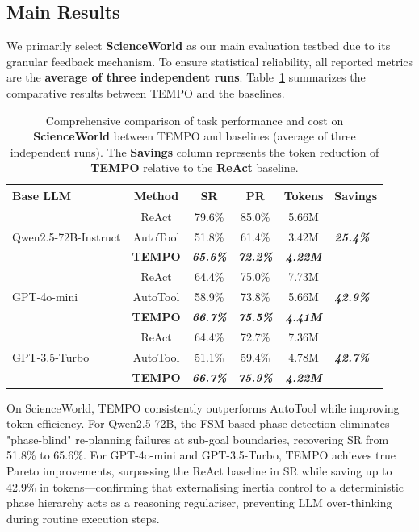 \documentclass[runningheads]{llncs}
\begin{document}
\subsection{Main Results}

We primarily select \textbf{ScienceWorld} as our main evaluation testbed due to its granular feedback mechanism. To ensure statistical reliability, all reported metrics are the \textbf{average of three independent runs}. Table~\ref{tab:main} summarizes the comparative results between TEMPO and the baselines.

\begin{table}[htb]
\centering
\small
\caption{Comprehensive comparison of task performance and cost on \textbf{ScienceWorld} between TEMPO and baselines (average of three independent runs). The \textbf{Savings} column represents the token reduction of \textbf{TEMPO} relative to the \textbf{ReAct} baseline.}
\vspace{2mm}
\begin{tabular}{lccccl}
\toprule
\textbf{Base LLM} & \textbf{Method} & \textbf{SR} & \textbf{PR} & \textbf{Tokens} & \textbf{Savings}\\
\midrule
\multirow{3}{*}{Qwen2.5-72B-Instruct} & ReAct & 79.6\% & 85.0\% & 5.66M & \multirow{3}{*}{\textsl{\textbf{25.4\%}}} \\
& AutoTool & 51.8\% & 61.4\% & 3.42M & \\
& \textbf{TEMPO} & \textsl{\textbf{65.6\%}} & \textsl{\textbf{72.2\%}} & \textsl{\textbf{4.22M}} & \\
\midrule
\multirow{3}{*}{GPT-4o-mini} & ReAct & 64.4\% & 75.0\% & 7.73M & \multirow{3}{*}{\textsl{\textbf{42.9\%}}}\\
& AutoTool & 58.9\% & 73.8\% & 5.66M & \\
& \textbf{TEMPO} & \textsl{\textbf{66.7\%}} & \textsl{\textbf{75.5\%}} & \textsl{\textbf{4.41M}} & \\
\midrule
\multirow{3}{*}{GPT-3.5-Turbo} & ReAct & 64.4\% & 72.7\% & 7.36M & \multirow{3}{*}{\textsl{\textbf{42.7\%}}}\\
& AutoTool & 51.1\% & 59.4\% & 4.78M & \\
& \textbf{TEMPO} & \textsl{\textbf{66.7\%}} & \textsl{\textbf{75.9\%}} & \textsl{\textbf{4.22M}} & \\
\bottomrule
\end{tabular}
\label{tab:main}
\end{table}

On ScienceWorld, TEMPO consistently outperforms AutoTool while improving token efficiency. For Qwen2.5-72B, the FSM-based phase detection eliminates "phase-blind" re-planning failures at sub-goal boundaries, recovering SR from 51.8\% to 65.6\%. For GPT-4o-mini and GPT-3.5-Turbo, TEMPO achieves true Pareto improvements, surpassing the ReAct baseline in SR while saving up to 42.9\% in tokens—confirming that externalising inertia control to a deterministic phase hierarchy acts as a reasoning regulariser, preventing LLM over-thinking during routine execution steps.
\end{document}
